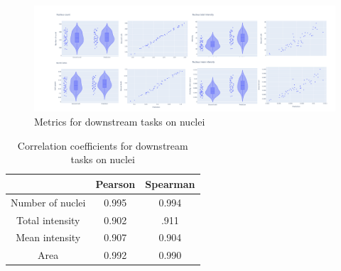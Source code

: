 \begin{figure}[H]
	\begin{center}
		\includegraphics[width=\linewidth]{bilder/nuclei/metric/combined-metrics.png}
		\caption{Metrics for downstream tasks on nuclei}\label{fig:nuclei-downstream-metrics}
	\end{center}
\end{figure}

\begin{table}[H]
    \centering
    \caption{Correlation coefficients for downstream tasks on nuclei}
        \begin{adjustbox}{width=0.4\textwidth}
            \begin{tabular}{|c|c|c|}\hline
                &Pearson&Spearman
                \\\hline\hline
                Number of nuclei&0.995&0.994\\\hline
                Total intensity&0.902&.911\\\hline
                Mean intensity&0.907&0.904\\\hline
                Area&0.992&0.990\\\hline
            \end{tabular}
        \end{adjustbox}
\end{table}
